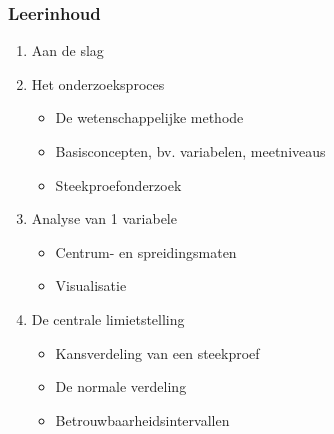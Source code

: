 \documentclass[aspectratio=169]{beamer}
\begin{document}

\begin{frame}
  \frametitle{Leerinhoud}
  
  \begin{enumerate}
    \item Aan de slag
    \item Het onderzoeksproces
    \begin{itemize}
      \item De wetenschappelijke methode
      \item Basisconcepten, bv. variabelen, meetniveaus
      \item Steekproefonderzoek
    \end{itemize}
    \item Analyse van 1 variabele
    \begin{itemize}
      \item Centrum- en spreidingsmaten
      \item Visualisatie
    \end{itemize}
    \item De centrale limietstelling
    \begin{itemize}
      \item Kansverdeling van een steekproef
      \item De normale verdeling
      \item Betrouwbaarheidsintervallen
    \end{itemize}
  \end{enumerate}

\end{frame}
\end{document}
